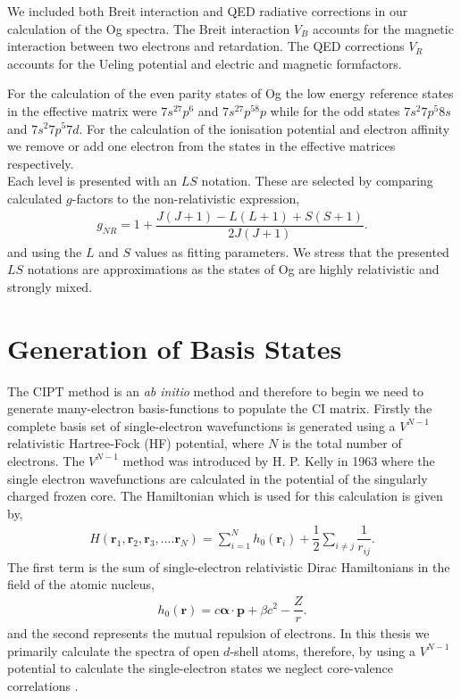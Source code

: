 \documentclass[10pt,a4paper, twoside, openright]{report}
\begin{document}
We included both Breit interaction\cite{Breit1929, Mann1971, DF2016}  and QED radiative corrections in our calculation of the Og spectra.  The Breit interaction $V_B$ accounts for the magnetic interaction between two electrons and retardation. The QED corrections $V_R$ accounts for the Ueling potential and electric and magnetic formfactors\cite{FG2005}. 

For the calculation of the even parity states of Og the low energy reference states in the effective matrix were $7s^27p^6$ and $7s^27p^58p$ while for the odd states $7s^2 7p^5 8s$ and $7s^2 7p^5 7d$. For the calculation of the ionisation potential and electron affinity we remove or add one electron from the states in the effective matrices respectively.\\
 
Each level is presented with an $LS$ notation. These are selected by comparing calculated $g$-factors to the non-relativistic expression,
\begin{align} 
g_{NR} =  1 + \dfrac{J(J + 1) - L(L+1) + S(S+1)}{2J(J+1)}.
\end{align}
and using the $L$ and $S$ values as fitting parameters. We stress that the presented $LS$ notations are approximations as the states of Og are highly relativistic and strongly mixed. \\
\fi
\section{Generation of Basis States} \label{sec:HF}
The CIPT method is an \textit{ab initio} method and therefore to begin we need to generate many-electron basis-functions to populate the CI matrix. Firstly the complete basis set of single-electron wavefunctions is generated using a $V^{N-1}$ relativistic Hartree-Fock (HF) potential, where $N$ is the total number of electrons. The $V^{N-1}$ method was introduced by H. P. Kelly in 1963 \cite{Kelly1963, Kelly1964} where the single electron wavefunctions are calculated in the potential of the singularly charged frozen core.  The Hamiltonian which is used for this calculation is given by,
\begin{align}
H\left(\textbf{r}_1,\textbf{r}_2, \textbf{r}_3, .... \textbf{r}_N\right) = \sum_{i=1}^{N} h_0\left(\textbf{r}_i\right) + \dfrac{1}{2}\sum_{i\neq j}\dfrac{1}{r_{ij}}.
\end{align}
The first term is the sum of single-electron relativistic Dirac Hamiltonians in the field of the atomic nucleus,
\begin{align*}
h_0\left(\textbf{r}\right) = c \boldsymbol{\alpha}\cdot\textbf{p} + \beta c^2 - \dfrac{Z}{r}.
\end{align*}
and the second represents the mutual repulsion of electrons.   In this thesis we primarily calculate the spectra of open $d$-shell atoms, therefore, by using a $V^{N-1}$ potential to calculate the single-electron states we neglect core-valence correlations \cite{DBHF2017}. 
\end{document}
